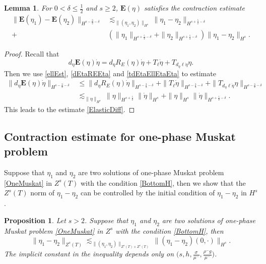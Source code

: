\documentclass[12pt]{amsart}
\newtheorem{proposition}[theorem]{Proposition}
\newtheorem{lemma}[theorem]{Lemma}
\theoremstyle{definition}
\numberwithin{equation}{section}
\newcommand{\f}{\frac}
\begin{document}
\begin{lemma}
For $0<\delta \leq \f12$ and $s\geq2$, $\mathbf{E}(\eta)$ satisfies the contraction estimate
\begin{equation} \label{ElasticDiff}
\begin{aligned}
 \|\mathbf{E}(\eta_1) - \mathbf{E}(\eta_2) \|_{H^{s-\f32-\delta}} &\lesssim_{\|(\eta_1,\eta_2)\|_{H^s}}\|\eta_1 - \eta_2\|_{H^{s+\f52-\delta}}\\
 +&(\|\eta_1\|_{H^{s+\f52-\delta}}+\|\eta_2\|_{H^{s+\f52-\delta}})\|\eta_1 - \eta_2\|_{H^{s}}.
 \end{aligned}
\end{equation}
\end{lemma}
\begin{proof}
Recall that
\begin{equation*}
d_{\eta}\mathbf{E}(\eta)\dot{\eta} = d_{\eta}R_E(\eta)\dot{\eta}+T_{\ell}\dot{\eta}+T_{d_{\eta}\ell\dot{\eta}}\eta.
\end{equation*}
Then we use \eqref{ellEst}, \eqref{dEtaREEta} and \eqref{tdEtaEllEtaEta} to estimate
\begin{align*}
 \|d_{\eta}\mathbf{E}(\eta)\dot{\eta} \|_{H^{s-\f32-\delta}} &\leq \|d_{\eta}R_E(\eta)\dot{\eta} \|_{H^{s-\f32-\delta}} + \|T_{\ell}\dot{\eta}\|_{H^{s-\f32-\delta}} + \|T_{d_{\eta}\ell\dot{\eta}}\eta\|_{H^{s-\f32-\delta}} \\
 &\lesssim_{\|\eta\|_{H^s}} \|\eta\|_{H^{s+\f52}} \| \dot{\eta}\|_{H^s} + \| \eta\|_{H^s}\|\dot{\eta}\|_{H^{s+\f52-\delta}}.
\end{align*}
This leads to the estimate \eqref{ElasticDiff}.
\end{proof}

\subsection{Contraction estimate for one-phase Muskat problem}
Suppose that $\eta_1$ and $\eta_2$ are two solutions of one-phase Muskat problem \eqref{OneMuskat} in $Z^s(T)$ with the condition \eqref{BottomH}, then we show that the $Z^s(T)$ norm of $\eta_1 - \eta_2$ can be controlled by the initial condition of $\eta_1 - \eta_2$ in $H^s$.
\begin{proposition}\label{t:propConOne}
Let $s>2$.
Suppose that $\eta_1$ and $\eta_2$ are two solutions of one-phase Muskat problem \eqref{OneMuskat} in $Z^s$ with the condition \eqref{BottomH}, then
\begin{equation} \label{ContractOneMuskat}
 \|\eta_1 - \eta_2\|_{Z^s(T)} \lesssim_{\|(\eta_1, \eta_2)\|_{Z^s(T) \times Z^s(T)}} \|(\eta_1 - \eta_2)(0,\cdot) \|_{H^s}.
\end{equation}
The implicit constant in the inequality depends only on $\big(s,h, \frac{\sigma}{\mu^-},  \frac{\rho^- g}{ \mu^-}\big)$.
\end{proposition}
\end{document}
